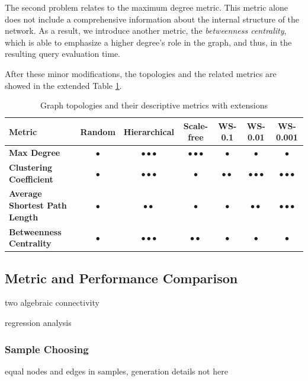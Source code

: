 The second problem relates to the maximum degree metric. This metric alone does not include a comprehensive information about the internal structure of the network. As a result, we introduce another metric, the \textit{betweenness centrality}, which is able to emphasize a higher degree's role in the graph, and thus, in the resulting query evaluation time.

After these minor modifications, the topologies and the related metrics are showed in the extended Table \ref{tab:topology_metrics2}.
\begin{table}[ht]
	\footnotesize
	\centering
	
	\begin{tabular}{ l c c c c c c}
		\toprule
		Metric & Random & Hierarchical & Scale-free & WS-0.1 & WS-0.01 & WS-0.001 \\ 
		\midrule 
		\textbf{Max Degree} & $\bullet$ & $\bullet \bullet \bullet$ & $\bullet \bullet \bullet$ & $\bullet$ & $\bullet$ & $\bullet$ \\ \hline
		\textbf{Clustering Coefficient} & $\bullet$ & $\bullet \bullet \bullet$ & $\bullet$ & $\bullet \bullet$ & $\bullet \bullet \bullet$ & $\bullet \bullet \bullet$\\ \hline
		\textbf{Average Shortest Path Length} & $\bullet$ & $\bullet \bullet$ & $\bullet$ & $\bullet $ & $\bullet \bullet$ & $\bullet \bullet \bullet$\\ \hline
		\textbf{Betweenness Centrality} & $\bullet$ & $\bullet \bullet \bullet$ & $\bullet \bullet$ & $\bullet$ & $\bullet$ & $\bullet$\\ \hline
		\bottomrule
	\end{tabular}
	\caption{Graph topologies and their descriptive metrics with extensions}
	\label{tab:topology_metrics2}
\end{table}


\subsection{Metric and Performance Comparison}

two algebraic connectivity

regression analysis

\subsubsection{Sample Choosing}

equal nodes and edges in samples, generation details not here

